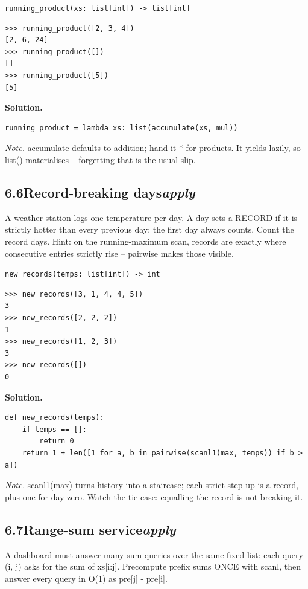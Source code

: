 \documentclass[10pt,letterpaper]{book}
\begin{document}
\noindent\texttt{running\_product(xs: list[int]) -> list[int]}
\begin{lstlisting}[style=ex]
>>> running_product([2, 3, 4])
[2, 6, 24]
>>> running_product([])
[]
>>> running_product([5])
[5]
\end{lstlisting}
\noindent\textbf{Solution.}
\begin{lstlisting}[style=code]
running_product = lambda xs: list(accumulate(xs, mul))
\end{lstlisting}
\noindent\textit{Note.} accumulate defaults to addition; hand it * for products. It yields lazily, so list() materialises -- forgetting that is the usual slip.

\subsection*{6.6\quad Record-breaking days\hfill\textnormal{\textit{apply}}}
A weather station logs one temperature per day. A day sets a RECORD if it is strictly hotter than every previous day; the first day always counts. Count the record days. Hint: on the running-maximum scan, records are exactly where consecutive entries strictly rise -- pairwise makes those visible.

\noindent\texttt{new\_records(temps: list[int]) -> int}
\begin{lstlisting}[style=ex]
>>> new_records([3, 1, 4, 4, 5])
3
>>> new_records([2, 2, 2])
1
>>> new_records([1, 2, 3])
3
>>> new_records([])
0
\end{lstlisting}
\noindent\textbf{Solution.}
\begin{lstlisting}[style=code]
def new_records(temps):
    if temps == []:
        return 0
    return 1 + len([1 for a, b in pairwise(scanl1(max, temps)) if b > a])
\end{lstlisting}
\noindent\textit{Note.} scanl1(max) turns history into a staircase; each strict step up is a record, plus one for day zero. Watch the tie case: equalling the record is not breaking it.

\subsection*{6.7\quad Range-sum service\hfill\textnormal{\textit{apply}}}
A dashboard must answer many sum queries over the same fixed list: each query (i, j) asks for the sum of xs[i:j]. Precompute prefix sums ONCE with scanl, then answer every query in O(1) as pre[j] - pre[i].
\end{document}
